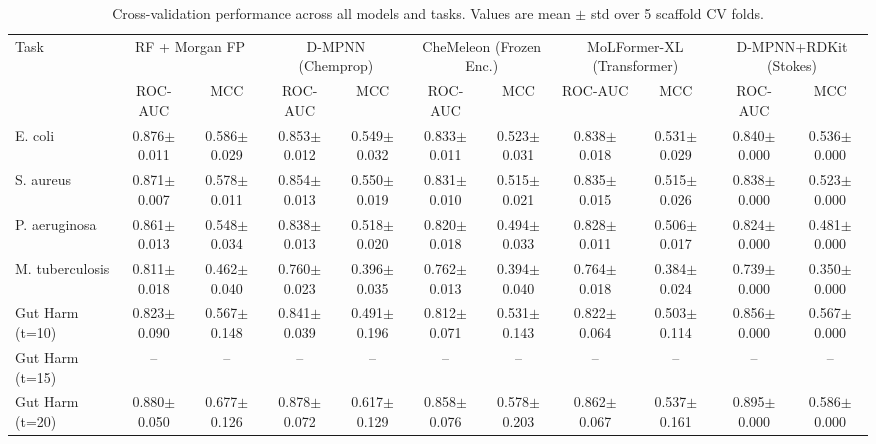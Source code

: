 \begin{table}[ht]
\centering
\caption{Cross-validation performance across all models and tasks. Values are mean $\pm$ std over 5 scaffold CV folds.}
\label{tab:model_comparison}
\small
\begin{tabular}{lcccccccccc}
\toprule
Task & \multicolumn{2}{c}{RF + Morgan FP} & \multicolumn{2}{c}{D-MPNN (Chemprop)} & \multicolumn{2}{c}{CheMeleon (Frozen Enc.)} & \multicolumn{2}{c}{MoLFormer-XL (Transformer)} & \multicolumn{2}{c}{D-MPNN+RDKit (Stokes)} \\
 & ROC-AUC & MCC & ROC-AUC & MCC & ROC-AUC & MCC & ROC-AUC & MCC & ROC-AUC & MCC \\
\midrule
E. coli & 0.876$\pm$0.011 & 0.586$\pm$0.029 & 0.853$\pm$0.012 & 0.549$\pm$0.032 & 0.833$\pm$0.011 & 0.523$\pm$0.031 & 0.838$\pm$0.018 & 0.531$\pm$0.029 & 0.840$\pm$0.000 & 0.536$\pm$0.000 \\
S. aureus & 0.871$\pm$0.007 & 0.578$\pm$0.011 & 0.854$\pm$0.013 & 0.550$\pm$0.019 & 0.831$\pm$0.010 & 0.515$\pm$0.021 & 0.835$\pm$0.015 & 0.515$\pm$0.026 & 0.838$\pm$0.000 & 0.523$\pm$0.000 \\
P. aeruginosa & 0.861$\pm$0.013 & 0.548$\pm$0.034 & 0.838$\pm$0.013 & 0.518$\pm$0.020 & 0.820$\pm$0.018 & 0.494$\pm$0.033 & 0.828$\pm$0.011 & 0.506$\pm$0.017 & 0.824$\pm$0.000 & 0.481$\pm$0.000 \\
M. tuberculosis & 0.811$\pm$0.018 & 0.462$\pm$0.040 & 0.760$\pm$0.023 & 0.396$\pm$0.035 & 0.762$\pm$0.013 & 0.394$\pm$0.040 & 0.764$\pm$0.018 & 0.384$\pm$0.024 & 0.739$\pm$0.000 & 0.350$\pm$0.000 \\
Gut Harm (t=10) & 0.823$\pm$0.090 & 0.567$\pm$0.148 & 0.841$\pm$0.039 & 0.491$\pm$0.196 & 0.812$\pm$0.071 & 0.531$\pm$0.143 & 0.822$\pm$0.064 & 0.503$\pm$0.114 & 0.856$\pm$0.000 & 0.567$\pm$0.000 \\
Gut Harm (t=15) & -- & -- & -- & -- & -- & -- & -- & -- & -- & -- \\
Gut Harm (t=20) & 0.880$\pm$0.050 & 0.677$\pm$0.126 & 0.878$\pm$0.072 & 0.617$\pm$0.129 & 0.858$\pm$0.076 & 0.578$\pm$0.203 & 0.862$\pm$0.067 & 0.537$\pm$0.161 & 0.895$\pm$0.000 & 0.586$\pm$0.000 \\
\bottomrule
\end{tabular}
\end{table}
